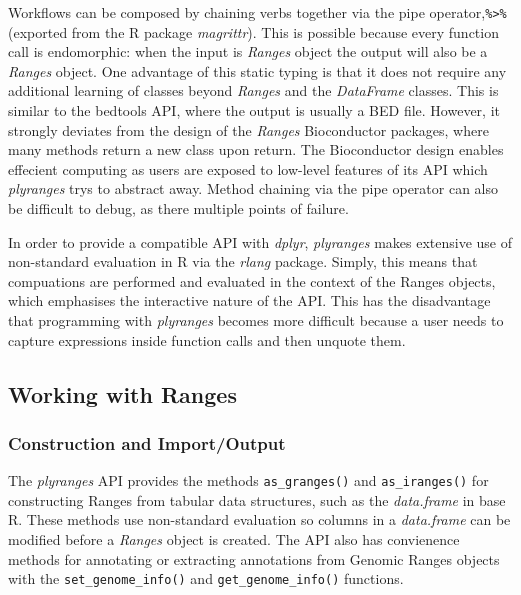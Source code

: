\documentclass[10pt,letterpaper]{article}
\begin{document}
Workflows can be composed by chaining verbs together via the pipe
operator,\texttt{\%\textgreater{}\%} (exported from the R package
\emph{magrittr}). This is possible because every function call is
endomorphic: when the input is \emph{Ranges} object the output will also
be a \emph{Ranges} object. One advantage of this static typing is that
it does not require any additional learning of classes beyond
\emph{Ranges} and the \emph{DataFrame} classes. This is similar to the
bedtools API, where the output is usually a BED file. However, it
strongly deviates from the design of the \emph{Ranges} Bioconductor
packages, where many methods return a new class upon return. The
Bioconductor design enables effecient computing as users are exposed to
low-level features of its API which \emph{plyranges} trys to abstract
away. Method chaining via the pipe operator can also be difficult to
debug, as there multiple points of failure.

In order to provide a compatible API with \emph{dplyr}, \emph{plyranges}
makes extensive use of non-standard evaluation in R via the \emph{rlang}
package. Simply, this means that compuations are performed and evaluated
in the context of the Ranges objects, which emphasises the interactive
nature of the API. This has the disadvantage that programming with
\emph{plyranges} becomes more difficult because a user needs to capture
expressions inside function calls and then unquote them.

\hypertarget{working-with-ranges}{%
\subsection{Working with Ranges}\label{working-with-ranges}}

\hypertarget{construction-and-importoutput}{%
\subsubsection{Construction and
Import/Output}\label{construction-and-importoutput}}

The \emph{plyranges} API provides the methods \texttt{as\_granges()} and
\texttt{as\_iranges()} for constructing Ranges from tabular data
structures, such as the \emph{data.frame} in base R. These methods use
non-standard evaluation so columns in a \emph{data.frame} can be
modified before a \emph{Ranges} object is created. The API also has
convienence methods for annotating or extracting annotations from
Genomic Ranges objects with the \texttt{set\_genome\_info()} and
\texttt{get\_genome\_info()} functions.
\end{document}
